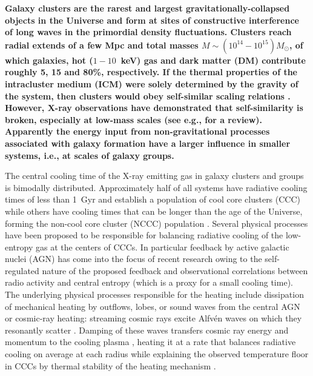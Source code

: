 \documentclass[useAMS,usenatbib]{mn2e}
\begin{document}
{\bf Galaxy clusters are the rarest and largest gravitationally-collapsed
  objects in the Universe and form at sites of constructive interference of long
  waves in the primordial density fluctuations. Clusters reach radial extends of
  a few Mpc and total masses $M \sim (10^{14} - 10^{15}) M_{\odot}$, of which
  galaxies, hot ($1-10$~keV) gas and dark matter (DM) contribute roughly 5, 15
  and 80\%, respectively. If the thermal properties of the intracluster medium
  (ICM) were solely determined by the gravity of the system, then clusters would
  obey self-similar scaling relations \citep{1986MNRAS.222..323K}.  However,
  X-ray observations have demonstrated that self-similarity is broken,
  especially at low-mass scales (see e.g., \citealp{2005RvMP...77..207V} for a
  review). Apparently the energy input from non-gravitational processes
  associated with galaxy formation have a larger influence in smaller systems,
  i.e., at scales of galaxy groups.

  The central cooling time of the X-ray emitting gas in galaxy clusters and
  groups is bimodally distributed. Approximately half of all systems have
  radiative cooling times of less than 1~Gyr and establish a population of cool
  core clusters (CCC) while others have cooling times that can be longer than
  the age of the Universe, forming the non-cool core cluster (NCCC) population
  \citep{2009ApJS..182...12C,2010A&A...513A..37H}. Several physical processes
  have been proposed to be responsible for balancing radiative cooling of the
  low-entropy gas at the centers of CCCs. In particular feedback by active
  galactic nuclei (AGN) has come into the focus of recent research
  \citep{2007ARA&A..45..117M, 2012NJPh...14e5023M} owing to the self-regulated
  nature of the proposed feedback and observational correlations between radio
  activity and central entropy (which is a proxy for a small cooling time). The
  underlying physical processes responsible for the heating include dissipation
  of mechanical heating by outflows, lobes, or sound waves from the central AGN
  \citep[e.g.,][]{2001ApJ...554..261C, 2002Natur.418..301B, 2002ApJ...581..223R,
    2012MNRAS.424..190G} or cosmic-ray heating: streaming cosmic rays excite
  Alfv\'en waves on which they resonantly scatter \citep{1969ApJ...156..445K}.
  Damping of these waves transfers cosmic ray energy and momentum to the cooling
  plasma \citep{1991ApJ...377..392L, 2008MNRAS.384..251G, 2011A&A...527A..99E,
    2013MNRAS.434.2209W}, heating it at a rate that balances radiative cooling
  on average at each radius while explaining the observed temperature floor in
  CCCs by thermal stability of the heating mechanism
  \citep{2013arXiv1303.5443P}.

}
\end{document}

